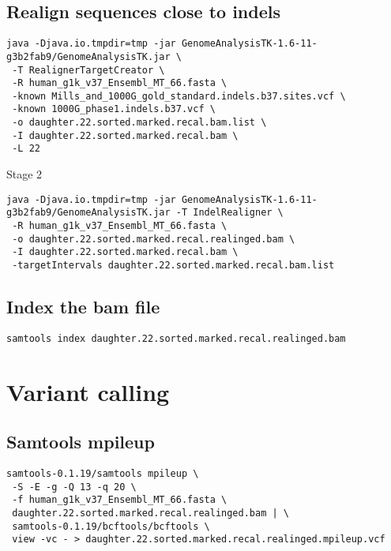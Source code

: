 \documentclass{article}
\begin{document}
\subsection{Realign sequences close to indels}
\begin{verbatim}
java -Djava.io.tmpdir=tmp -jar GenomeAnalysisTK-1.6-11-g3b2fab9/GenomeAnalysisTK.jar \
 -T RealignerTargetCreator \
 -R human_g1k_v37_Ensembl_MT_66.fasta \
 -known Mills_and_1000G_gold_standard.indels.b37.sites.vcf \
 -known 1000G_phase1.indels.b37.vcf \
 -o daughter.22.sorted.marked.recal.bam.list \
 -I daughter.22.sorted.marked.recal.bam \
 -L 22
 \end{verbatim}

Stage 2
\begin{verbatim}
java -Djava.io.tmpdir=tmp -jar GenomeAnalysisTK-1.6-11-g3b2fab9/GenomeAnalysisTK.jar -T IndelRealigner \
 -R human_g1k_v37_Ensembl_MT_66.fasta \
 -o daughter.22.sorted.marked.recal.realinged.bam \
 -I daughter.22.sorted.marked.recal.bam \
 -targetIntervals daughter.22.sorted.marked.recal.bam.list
\end{verbatim}

\subsection{Index the bam file}
\begin{verbatim}
samtools index daughter.22.sorted.marked.recal.realinged.bam
\end{verbatim}


\section{Variant calling}


\subsection{Samtools mpileup}
\begin{verbatim}
samtools-0.1.19/samtools mpileup \
 -S -E -g -Q 13 -q 20 \
 -f human_g1k_v37_Ensembl_MT_66.fasta \
 daughter.22.sorted.marked.recal.realinged.bam | \
 samtools-0.1.19/bcftools/bcftools \
 view -vc - > daughter.22.sorted.marked.recal.realinged.mpileup.vcf
\end{verbatim}
\end{document}
